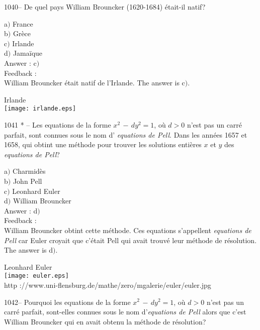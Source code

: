 ﻿\documentclass[letterpaper, 12pt]{article}
\begin{document}
1040-- De quel pays William Brouncker (1620-1684) \'etait-il natif?

a$)$ France  \\
b$)$ Gr\`ece  \\
c$)$ Irlande \\
d$)$ Jama\"ique\\

Answer : c$)$\\

Feedback : \\
William Brouncker \'etait natif de l'Irlande.
The answer is c$)$.\\
        \begin{center}
        Irlande\\
    \texttt{[image: irlande.eps]}\\
    \end{center}

1041 * -- Les equations de la forme $x^2\,-\,dy^2=1$, o\`u $d>0$
n'est pas un carr\'e parfait, sont connues sous le nom d'{\sl
equations de Pell}. Dans les ann\'ees 1657 et 1658, qui obtint une
m\'ethode pour trouver les solutions enti\`eres $x$ et $y$ des {\sl
equations de Pell}?

a$)$ Charmid\`es \\
b$)$ John Pell \\
c$)$ Leonhard Euler  \\
d$)$ William Brouncker\\

Answer : d$)$\\

Feedback : \\
William Brouncker obtint cette m\'ethode. Ces equations
s'appellent {\sl equations de Pell} car Euler croyait que
c'\'etait Pell qui avait trouv\'e leur m\'ethode de r\'esolution.
The answer is d$)$.\\

        \begin{center}
        Leonhard Euler\\
    \texttt{[image: euler.eps]}\\
        {\footnotesize http
://www.uni-flensburg.de/mathe/zero/mgalerie/euler/euler.jpg}
    \end{center}

1042-- Pourquoi les equations de la forme $x^2\,-\,dy^2=1$, o\`u
$d>0$ n'est pas un carr\'e parfait, sont-elles connues sous le nom
d'{\sl equations de Pell} alors que c'est William Brouncker qui en
avait obtenu la m\'ethode de r\'esolution?
\end{document}
